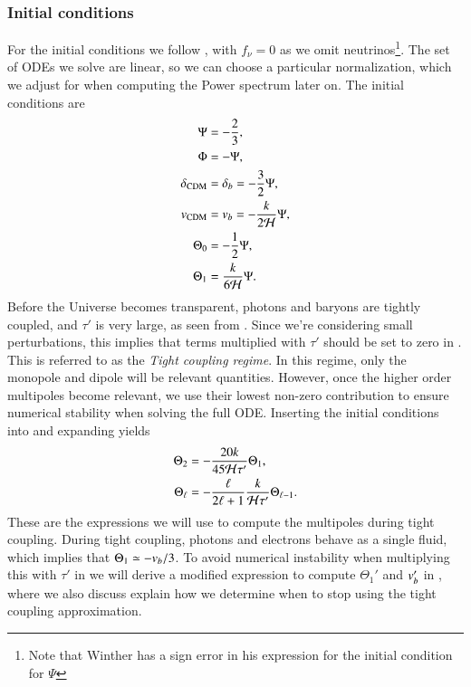 \subsubsection{Initial conditions} \label{sssec:M3:theory:initial_conditions}
For the initial conditions we follow \cite{winther}, with $f_\nu=0$ as we omit neutrinos\footnote{Note that Winther has a sign error in his expression for the initial condition for $\Psi$}. The set of ODEs we solve are linear, so we can choose a particular normalization, which we adjust for when computing the Power spectrum later on. The initial conditions are      
\begin{subequations} \label{eq:M3:theory:pert_ODE_IC}
    \begin{align}
        \Psi &= -\frac{2}{3}, \label{eq:M3:theory:pert_ODE_IC_Psi} \\
        \Phi &= - \Psi, \label{eq:M3:theory:pert_ODE_IC_Phi} \\
        \delta_\mathrm{CDM} &= \delta_b = -\frac{3}{2}\Psi, \label{eq:M3:theory:pert_ODE_IC_delta_cdm} \\
        v_\mathrm{CDM} &= v_b = -\frac{k}{2\mathcal{H}} \Psi, \label{eq:M3:theory:pert_ODE_IC_v_cdm} \\
        \Theta_0 &= -\frac{1}{2}\Psi, \label{eq:M3:theory:pert_ODE_IC_Theta0} \\
        \Theta_1 &= \frac{k}{6\mathcal{H}}\Psi. \label{eq:M3:theory:pert_ODE_IC_Theta1} 
    \end{align}
\end{subequations}
Before the Universe becomes transparent, photons and baryons are tightly coupled, and $\tau'$ is very large, as seen from . Since we're considering small perturbations, this implies that terms multiplied with $\tau'$ should be set to zero in . This is referred to as the \textit{Tight coupling regime}. In this regime, only the monopole and dipole will be relevant quantities. However, once the higher order multipoles become relevant, we use their lowest non-zero contribution to ensure numerical stability when solving the full ODE. Inserting the initial conditions into  and expanding yields 
\begin{subequations} \label{eq:M3:theory:IC_Thetas}
    \begin{align}
        \Theta_2 &= - \frac{20k}{45\mathcal{H}\tau'}\Theta_1, \label{eq:M3:theory:IC_Theta2} \\
        \Theta_\ell &= - \frac{\ell}{2\ell+1} \frac{k}{\mathcal{H}\tau'}\Theta_{\ell-1} \label{eq:M3:theory:IC_Theta_ell}. 
    \end{align}
\end{subequations}
These are the expressions we will use to compute the multipoles during tight coupling. During tight coupling, photons and electrons behave as a single fluid, which implies that $\Theta_1\simeq-v_b/3$. To avoid numerical instability when multiplying this with $\tau'$ in  we will derive a modified expression to compute $\Theta_1'$ and $v_b'$ in , where we also discuss explain how we determine when to stop using the tight coupling approximation.  


